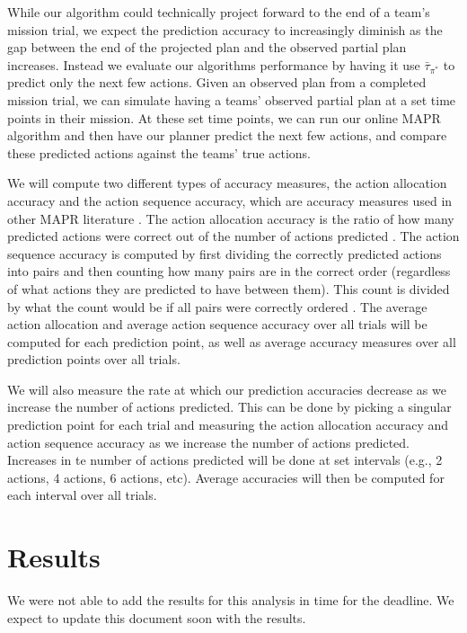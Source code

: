 While our algorithm could technically project forward to the end of a team's mission trial, we expect the prediction accuracy to increasingly diminish as the gap between the end of the projected plan and the observed partial plan increases. Instead we evaluate our algorithms performance by having it use $\bar{\tau}_{\pi^*}$ to predict only the next few actions. Given an observed plan from a completed mission trial, we can simulate having a teams' observed partial plan at a set time points in their mission. At these set time points, we can run our online MAPR algorithm and then have our planner predict the next few actions, and compare these predicted actions against the teams' true actions.

We will compute two different types of accuracy measures, the action allocation accuracy and the action sequence accuracy, which are accuracy measures used in other MAPR literature \citep{Kim_Chacha_Shah_2015}. The action allocation accuracy is the ratio of how many predicted actions were correct out of the number of actions predicted \citep{Kim_Chacha_Shah_2015}. The action sequence accuracy is computed by first dividing the correctly predicted actions into pairs and then counting how many pairs are in the correct order (regardless of what actions they are predicted to have between them). This count is divided by what the count would be if all pairs were correctly ordered \citep{Kim_Chacha_Shah_2015}. The average action allocation and average action sequence accuracy over all trials will be computed for each prediction point, as well as average accuracy measures over all prediction points over all trials.

We will also measure the rate at which our prediction accuracies decrease as we
increase the number of actions predicted. This can be done by picking a
singular prediction point for each trial and measuring the action allocation
accuracy and action sequence accuracy as we increase the number of actions
predicted. Increases in te number of actions predicted will be done at set
intervals (e.g., 2 actions, 4 actions, 6 actions, etc).  Average accuracies
will then be computed for each interval over all trials.

\section{Results}

We were not able to add the results for this analysis in time for the deadline.
We expect to update this document soon with the results.
